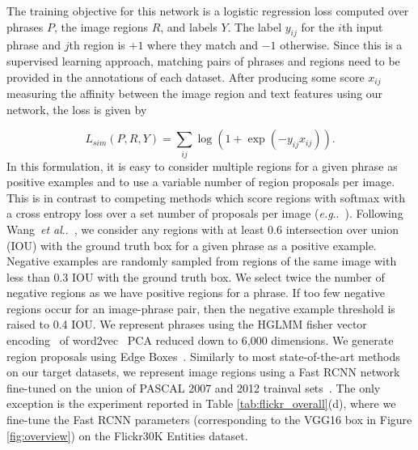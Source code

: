 \documentclass[runningheads]{llncs}
\makeatletter
\DeclareRobustCommand\onedot{\futurelet\@let@token\@onedot}
\def\@onedot{\ifx\@let@token.\else.\null\fi\xspace}
\def\eg{\emph{e.g}\onedot} \def\Eg{\emph{E.g}\onedot}
\def\etal{\emph{et al}\onedot}
\makeatother
\begin{document}
The training objective for this network is a logistic regression loss computed over phrases $P$, the image regions $R$, and labels $Y$. The label $y_{ij}$ for the $i$th input phrase and $j$th region is $+1$  where they match and $-1$ otherwise.  Since this is a supervised learning approach, matching pairs of phrases and regions need to be provided in the annotations of each dataset.  After producing some score $x_{ij}$ measuring the affinity between the image region and text features using our network, the loss is given by

\begin{equation}
L_{sim}(P,R,Y) = \sum_{ij}\log(1 + \exp{(-y_{ij}x_{ij})}).
\end{equation}\noindent In this formulation, it is easy to consider multiple regions for a given phrase as positive examples and to use a variable number of region proposals per image.  This is in contrast to competing methods which score regions with softmax with a cross entropy loss over a set number of proposals per image (\eg~\cite{fukui16emnlp,rohrbach2015,ChenICMR2017}).
\smallskip{}  Following Wang~\etal~\cite{wangTwoBranch2017}, we consider any regions with at least 0.6 intersection over union (IOU) with the ground truth box for a given phrase as a positive example.  Negative examples are randomly sampled from regions of the same image with less than 0.3 IOU with the ground truth box.  We select twice the number of negative regions as we have positive regions for a phrase.  If too few negative regions occur for an image-phrase pair, then the negative example threshold is raised to 0.4 IOU.
\smallskip{} We represent phrases using the HGLMM fisher vector encoding~\cite{klein2014fisher} of word2vec~\cite{mikolov2013efficient} PCA reduced down to 6,000 dimensions. We generate region proposals using Edge Boxes~\cite{ZitnickECCV14}. Similarly to most state-of-the-art methods on our target datasets, we represent image regions using a Fast RCNN network~\cite{girshickICCV15fastrcnn} fine-tuned on the union of PASCAL 2007 and 2012 trainval sets~\cite{pascal-voc-2012}. The only exception is the experiment reported in Table \ref{tab:flickr_overall}(d), where we fine-tune the Fast RCNN parameters (corresponding to the VGG16 box in Figure \ref{fig:overview}) on the Flickr30K Entities dataset.
\end{document}
